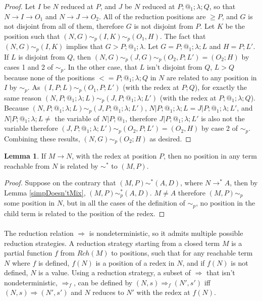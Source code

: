 \documentclass{article}
\theoremstyle{definition}
\theoremstyle{lemma}
\newtheorem{lemma}{Lemma}
\theoremstyle{remark}
\begin{document}
\begin{proof}
Let $I$ be $N$ reduced at $P$, and $J$ be $N$ reduced at $P;@_1;\lambda;Q$, so that $N \to I \to O_1$ and $N \to J \to O_2$. All of the reduction positions are $\geq P$, and $G$ is not disjoint from all of them, therefore $G$ is not disjoint from $P$. Let $K$ be the position such that $(N,G) \sim_p (I,K) \sim_p (O_1,H)$. The fact that $(N,G) \sim_p (I,K)$ implies that $G > P;@_1;\lambda$. Let $G = P;@_1;\lambda;L$ and $H = P;L'$. If $L$ is disjoint from $Q$, then $(N,G) \sim_p (J,G) \sim_p (O_2,P;L') = (O_2;H)$ by cases 1 and 2 of $\sim_p$. In the other case, that $L$ isn't disjoint from $Q$, $L > Q$ because none of the positions $<= P;@_1;\lambda;Q$ in $N$ are related to any position in $I$ by $\sim_p$. As $(I,P;L) \sim_p (O_1,P;L')$ (with the redex at $P;Q$), for exactly the same reason $(N,P;@_1;\lambda;L) \sim_p (J,P;@_1;\lambda;L')$ (with the redex at $P;@_1;\lambda;Q$). Because $(N,P;@_1;\lambda;L) \sim_p (J,P;@_1;\lambda;L')$, $N|P;@_1;\lambda;L = J|P;@_1;\lambda;L'$, and $N|P;@_1;\lambda;L \neq $ the variable of $N|P;@_1$, therefore $J|P;@_1;\lambda;L'$ is also not the variable therefore $(J,P;@_1;\lambda;L') \sim_p (O_2, P;L') = (O_2, H)$ by case 2 of $\sim_p$. Combining these results, $(N,G) \sim_p (O_2;H)$ as desired.

\end{proof}

\begin{lemma} \label{redexDestroyed}
If $M \to N$, with the redex at position $P$, then no position in any term reachable from $N$ is related by $\sim^*$ to $(M,P)$.
\end{lemma}
\begin{proof}
Suppose on the contrary that $(M,P) \sim^* (A,D)$, where $N \to^* A$, then by Lemma \ref{simpDoesn'tMix}, $(M,P) \sim_p^* (A,D)$. $M \neq A$ therefore $(M,P) \sim_p$ some position in $N$, but in all the cases of the definition of $\sim_p$, no position in the child term is related to the position of the redex.
\end{proof}

\paragraph{}
The reduction relation $\Rightarrow$ is nondeterministic, so it admits multiple possible reduction strategies. A reduction strategy starting from a closed term $M$ is a partial function $f$ from $Rch(M)$ to positions, such that for any reachable term $N$ where $f$ is defined, $f(N)$ is a position of a redex in $N$, and if $f(N)$ is not defined, $N$ is a value.
Using a reduction strategy, a subset of $\Rightarrow$ that isn't nondeterministic, $\Rightarrow_f$, can be defined by $(N,s) \Rightarrow_f (N',s')$ iff $(N,s) \Rightarrow (N',s')$ and $N$ reduces to $N'$ with the redex at $f(N)$.
\end{document}

